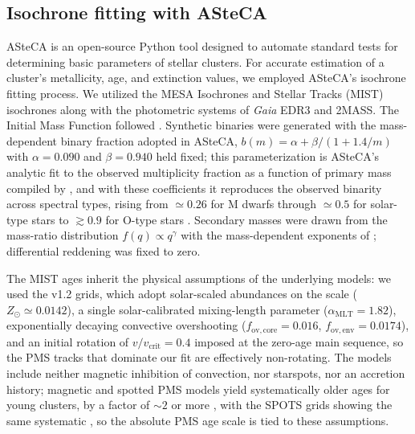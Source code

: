 \documentclass{aa}
\begin{document}
\subsection{Isochrone fitting with ASteCA}\label{subsec:asteca}
ASteCA \citep{2015A&A...576A...6P} is an open-source Python tool designed to automate standard tests for determining basic parameters of stellar clusters. For accurate estimation of a cluster's metallicity, age, and extinction values, we employed ASteCA's isochrone fitting process. We utilized the MESA Isochrones and Stellar Tracks (MIST) isochrones \citep{2016ApJS..222....8D, 2016ApJ...823..102C} along with the photometric systems of \textit{Gaia} EDR3 and 2MASS\@. The Initial Mass Function followed \citet{2014ApJ...796...75C}. Synthetic binaries were generated with the mass-dependent binary fraction adopted in ASteCA, $b(m)=\alpha+\beta/(1+1.4/m)$ with $\alpha=0.090$ and $\beta=0.940$ held fixed; this parameterization is ASteCA's analytic fit to the observed multiplicity fraction as a function of primary mass compiled by \citet{2023ASPC..534..275O}, and with these coefficients it reproduces the observed binarity across spectral types, rising from $\simeq0.26$ for M dwarfs through $\simeq0.5$ for solar-type stars to $\gtrsim0.9$ for O-type stars \citep{2013ARA&A..51..269D,2017ApJS..230...15M}. Secondary masses were drawn from the mass-ratio distribution $f(q)\propto q^{\gamma}$ with the mass-dependent exponents of \citet{2013ARA&A..51..269D}; differential reddening was fixed to zero.

The MIST ages inherit the physical assumptions of the underlying models: we used the v1.2 grids, which adopt solar-scaled abundances on the \citet{2009ARA&A..47..481A} scale ($Z_\odot\simeq0.0142$), a single solar-calibrated mixing-length parameter ($\alpha_{\mathrm{MLT}}=1.82$), exponentially decaying convective overshooting ($f_{\mathrm{ov,core}}=0.016$, $f_{\mathrm{ov,env}}=0.0174$), and an initial rotation of $v/v_{\mathrm{crit}}=0.4$ imposed at the zero-age main sequence, so the PMS tracks that dominate our fit are effectively non-rotating. The models include neither magnetic inhibition of convection, nor starspots, nor an accretion history; magnetic and spotted PMS models yield systematically older ages for young clusters, by a factor of $\sim2$ or more \citep{2016A&A...593A..99F,2015ApJ...807..174S}, with the SPOTS grids showing the same systematic \citep{2020ApJ...891...29S}, so the absolute PMS age scale is tied to these assumptions.
\end{document}
